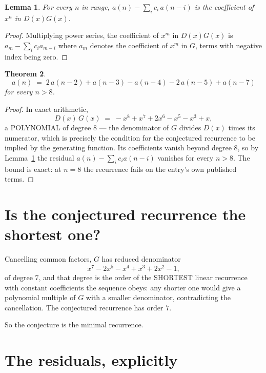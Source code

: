 \documentclass[11pt,a4paper]{article}
\theoremstyle{plain}
\newtheorem{theorem}{Theorem}
\newtheorem{lemma}[theorem]{Lemma}
\theoremstyle{definition}
\begin{document}
\begin{lemma}\label{lem:key}
For every $n$ in range, $a(n)-\sum_i c_i\,a(n-i)$ is the coefficient of $x^{n}$ in
$D(x)G(x)$.
\end{lemma}

\begin{proof}
Multiplying power series, the coefficient of $x^{m}$ in $D(x)G(x)$ is
$a_m-\sum_i c_i a_{m-i}$ where $a_m$ denotes the coefficient of $x^{m}$ in $G$, terms with
negative index being zero.
\end{proof}

\begin{theorem}
\[
a(n)\;=\;2\,a(n-2) + a(n-3) - a(n-4) - 2\,a(n-5) + a(n-7)
\]
for every $n>8$.
\end{theorem}

\begin{proof}
In exact arithmetic,
\[
D(x)\,G(x)\;=\;- x^{8} + x^{7} + 2 x^{6} - x^{5} - x^{3} + x,
\]
a POLYNOMIAL of degree $8$ --- the denominator of $G$ divides $D(x)$ times its numerator,
which is precisely the condition for the conjectured recurrence to be implied by the
generating function. Its coefficients vanish beyond degree $8$, so by
Lemma~\ref{lem:key} the residual $a(n)-\sum_ic_ia(n-i)$ vanishes for every
$n>8$. The bound is exact: at $n=8$ the recurrence fails on the entry's own published terms.
\end{proof}

\section{Is the conjectured recurrence the shortest one?}

Cancelling common factors, $G$ has reduced denominator
\[
x^{7} - 2 x^{5} - x^{4} + x^{3} + 2 x^{2} - 1,
\]
of degree $7$, and that degree is the order of the SHORTEST linear recurrence with
constant coefficients the sequence obeys: any shorter one would give a polynomial multiple of
$G$ with a smaller denominator, contradicting the cancellation. The conjectured recurrence has
order $7$.

So the conjecture is the minimal recurrence.

\section{The residuals, explicitly}
\end{document}
